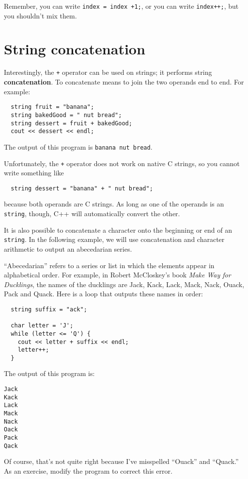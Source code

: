 Remember, you can write {\tt index = index +1;}, or you
can write {\tt index++;}, but you shouldn't mix them.

\section{String concatenation}

Interestingly, the {\tt +} operator can be used on strings;
it performs string {\bf concatenation}.  To concatenate means to
join the two operands end to end.  For example:

\begin{lstlisting}
  string fruit = "banana";
  string bakedGood = " nut bread";
  string dessert = fruit + bakedGood;
  cout << dessert << endl;
\end{lstlisting}
%
The output of this program is {\tt banana nut bread}.

Unfortunately, the {\tt +} operator does not work on native
C strings, so you cannot write something like

\begin{lstlisting}
  string dessert = "banana" + " nut bread";
\end{lstlisting}
%
because both operands are C strings.  As long as one of the
operands is an {\tt string}, though, C++ will automatically
convert the other.

It is also possible to concatenate a character onto the
beginning or end of an {\tt string}.  In the following example, we
will use concatenation and character arithmetic to output
an abecedarian series.

``Abecedarian'' refers to a series or list in which the elements
appear in alphabetical order.  For example, in Robert McCloskey's book
{\em Make Way for Ducklings}, the names of the ducklings are Jack,
Kack, Lack, Mack, Nack, Ouack, Pack and Quack.  Here is a loop that
outputs these names in order:

\begin{lstlisting}
  string suffix = "ack";

  char letter = 'J';
  while (letter <= 'Q') {
    cout << letter + suffix << endl;
    letter++;
  }
\end{lstlisting}
%
The output of this program is:

\begin{lstlisting}
Jack
Kack
Lack
Mack
Nack
Oack
Pack
Qack
\end{lstlisting}
%
Of course, that's not quite right because I've misspelled ``Ouack''
and ``Quack.''  As an exercise, modify the program to correct
this error.

